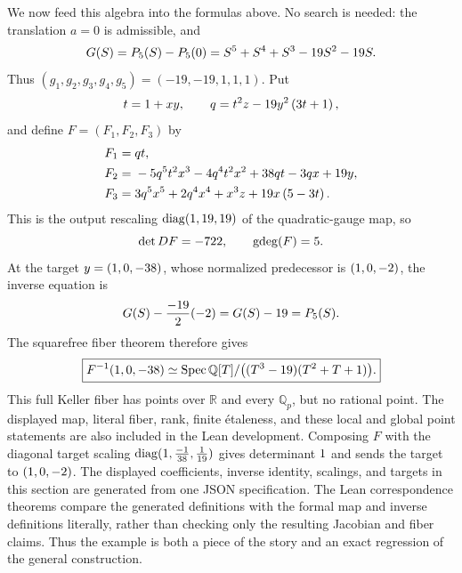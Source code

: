We now feed this algebra into the formulas above.  No search is needed: the
translation \(a=0\) is admissible, and
\[
 G(S)=P_5(S)-P_5(0)
 =S^{5} + S^{4} + S^{3} - 19S^{2} - 19S.
\]
Thus \((g_1,g_2,g_3,g_4,g_5)=(-19,-19,1,1,1)\).  Put
\[
 t=1+xy,\qquad q=t^{2} z - 19 y^{2} \left(3 t + 1\right),
\]
and define \(F=(F_1,F_2,F_3)\) by
\begin{align}
 F_1={}&q t,\notag\\
 F_2={}&- 5 q^{5} t^{2} x^{3} - 4 q^{4} t^{2} x^{2} + 38 q t - 3 q x + 19 y,\notag\\
 F_3={}&3 q^{5} x^{5} + 2 q^{4} x^{4} + x^{3} z + 19 x \left(5 - 3 t\right).
 \label{eq:explicit-quintic-map}
\end{align}
This is the output rescaling
\(\operatorname{diag}(1,19,19)\) of the quadratic-gauge
map, so
\[
 \det DF=-722,\qquad
 \operatorname{gdeg}(F)=5.
\]
At the target \(y=(1,0,-38)\), whose normalized predecessor
is \((1,0,-2)\), the inverse equation is
\[
 G(S)-\frac{-19}{2}(-2)=G(S)-19=P_5(S).
\]
The squarefree fiber theorem therefore gives
\[
 \boxed{F^{-1}(1,0,-38)
 \simeq\operatorname{Spec}\mathbb Q[T]/\bigl((T^3-19)(T^2+T+1)\bigr).}
\]
This full Keller fiber has points over \(\mathbb R\) and every
\(\mathbb Q_p\), but no rational point.  The displayed map, literal fiber,
rank, finite \'etaleness, and these local and global point statements are
also included in the Lean development.  Composing \(F\) with the diagonal
target scaling
\(\operatorname{diag}(1,\frac{-1}{38},\frac{1}{19})\) gives
determinant \(1\) and sends the target to
\((1,0,-2)\).
The displayed coefficients, inverse identity, scalings, and targets in this
section are generated from one JSON specification.  The Lean correspondence
theorems compare the generated definitions with the formal map and inverse
definitions literally, rather than checking only the resulting Jacobian and
fiber claims.  Thus the example is both a piece of the story and an exact
regression of the general construction.
